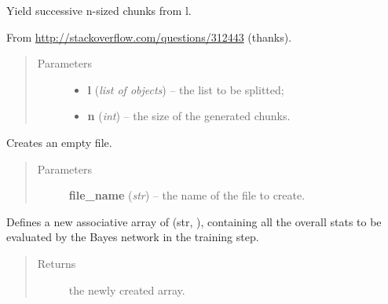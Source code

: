 \documentclass[letterpaper,10pt,english]{sphinxmanual}
\begin{document}
\begin{fulllineitems}
\begin{fulllineitems}
\begin{quote}
\begin{description}
\end{description}\end{quote}

\end{fulllineitems}


\begin{fulllineitems}
\label{index:utils.Utils.chunks}
Yield successive n-sized chunks from l.

From \href{http://stackoverflow.com/questions/312443}{http://stackoverflow.com/questions/312443} (thanks).
\begin{quote}\begin{description}
\item[{Parameters}] \leavevmode\begin{itemize}
\item {} 
\textbf{l} (\emph{list of objects}) -- the list to be splitted;

\item {} 
\textbf{n} (\emph{int}) -- the size of the generated chunks.

\end{itemize}

\end{description}\end{quote}

\end{fulllineitems}


\begin{fulllineitems}
\label{index:utils.Utils.create_file}
Creates an empty file.
\begin{quote}\begin{description}
\item[{Parameters}] \leavevmode
\textbf{file\_name} (\emph{str}) -- the name of the file to create.

\end{description}\end{quote}

\end{fulllineitems}


\begin{fulllineitems}
\label{index:utils.Utils.create_stats}
Defines a new associative array of (str, {\hyperref[index:gen_stat.Stat]{}}),
containing all the overall stats to be evaluated by the Bayes network
in the training step.
\begin{quote}\begin{description}
\item[{Returns}] \leavevmode
the newly created array.


\end{description}
\end{quote}
\end{fulllineitems}
\end{fulllineitems}
\end{document}
